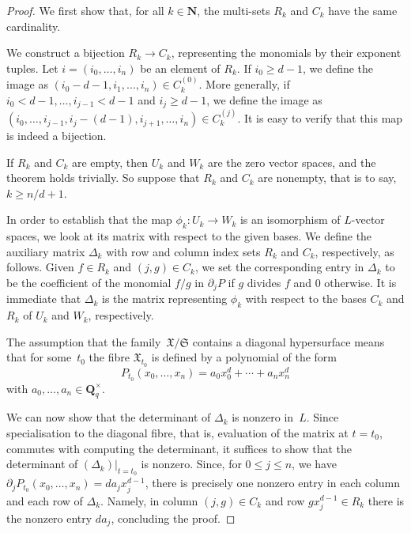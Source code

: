 \documentclass[a4paper,11pt]{article}
\numberwithin{equation}{section}
\newcommand{\NN}{\mathbf{N}} %
\newcommand{\QQ}{\mathbf{Q}} %
\renewcommand{\to}{\rightarrow}        %
\theoremstyle{definition}
\begin{document}
\begin{proof}
We first show that, for all $k \in \NN$, the multi-sets $R_k$ and $C_k$ 
have the same cardinality.

We construct a bijection $R_k \to C_k$, representing the 
monomials by their exponent tuples.  Let $i = (i_0, \dotsc, i_n)$ be an
element of $R_k$.  If $i_0 \geq d-1$, we define the image as
$(i_0-d-1, i_1, \dotsc, i_n) \in C_k^{(0)}$.  More generally, if 
$i_0 < d-1, \dotsc, i_{j-1} < d-1$ and $i_j \geq d-1$, we define the image as 
$(i_0, \dotsc, i_{j-1}, i_j-(d-1), i_{j+1}, \dotsc, i_n) \in C_k^{(j)}$.  
It is easy to verify that this map is indeed a bijection.

If $R_k$ and $C_k$ are empty, then $U_k$ and $W_k$ are the zero vector spaces, and
the theorem holds trivially. So suppose that $R_k$ and $C_k$ are nonempty, that is to
say, $k \geq n/d + 1$.

In order to establish that the map $\phi_k \colon U_k \to W_k$ is an 
isomorphism of $L$-vector spaces, we look at its matrix with respect to 
the given bases.   We define the auxiliary matrix $\Delta_k$ with 
row and column index sets $R_k$ and $C_k$, respectively, as follows.  
Given $f \in R_k$ and $(j,g) \in C_k$, we set the corresponding entry in 
$\Delta_k$ to be the coefficient of the monomial $f/g$ in $\partial_j P$ if 
$g$ divides $f$ and $0$ otherwise. It is immediate that $\Delta_k$ is the 
matrix representing $\phi_k$ with respect to the bases $C_k$ and $R_k$ of 
$U_k$ and $W_k$, respectively.

The assumption that the family~$\mathfrak{X}/\mathfrak{S}$ contains a diagonal 
hypersurface means that for some~$t_0$ the fibre $\mathfrak{X}_{t_0}$ is 
defined by a polynomial of the form 
\begin{equation}
P_{t_0}(x_0, \dotsc, x_n) = a_0 x_0^d + \dotsb + a_n x_n^d
\end{equation}
with $a_0, \dotsc, a_n \in \QQ_q^{\times}$.

We can now show that the determinant of $\Delta_k$ is nonzero in~$L$.  Since 
specialisation to the diagonal fibre, that is, evaluation of the matrix at 
$t = t_0$, commutes with computing the determinant, it suffices to show that 
the determinant of $(\Delta_k) \big |_{t=t_0}$ is nonzero.  Since, for 
$0 \leq j \leq n$, we have $\partial_j P_{t_0} (x_0, \dotsc, x_n) = d a_j x_j^{d-1}$, 
there is precisely one nonzero entry in each column and each row of $\Delta_k$.  
Namely, in column $(j, g) \in C_k$ and row $g x_j^{d-1} \in R_k$ there is the 
nonzero entry $d a_j$, concluding the proof.
\end{proof}
\end{document}
